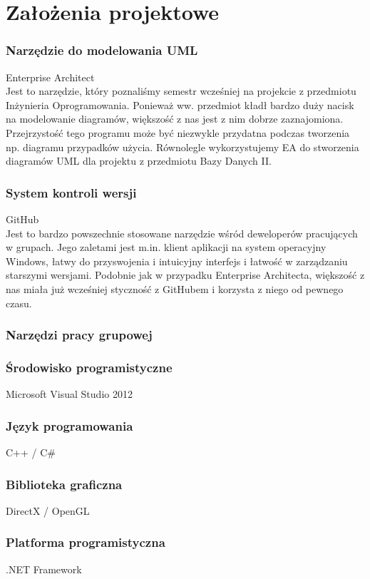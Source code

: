\documentclass[a4paper,twoside]{article}
\begin{document}



\newpage

\part{\huge \textbf{Założenia projektowe}}

\section{Narzędzie do modelowania UML}

{\Large Enterprise Architect} \\
Jest to narzędzie, który poznaliśmy semestr wcześniej na projekcie z przedmiotu Inżynieria Oprogramowania. Ponieważ ww. przedmiot kładł bardzo duży nacisk na modelowanie diagramów, większość z nas jest z nim dobrze zaznajomiona. Przejrzystość tego programu może być niezwykle przydatna podczas tworzenia np. diagramu przypadków użycia. Równolegle wykorzystujemy EA do stworzenia diagramów UML dla projektu z przedmiotu Bazy Danych II.

\section{System kontroli wersji}

{\Large GitHub} \\
Jest to bardzo powszechnie stosowane narzędzie wśród deweloperów pracujących w grupach. Jego zaletami jest m.in. klient aplikacji na system operacyjny Windows, łatwy do przyswojenia i intuicyjny interfejs i łatwość w zarządzaniu starszymi wersjami. Podobnie jak w przypadku Enterprise Architecta, większość z nas miała już wcześniej styczność z GitHubem i korzysta z niego od pewnego czasu.

\section{Narzędzi pracy grupowej}
\section{Środowisko programistyczne}
{\Large Microsoft Visual Studio 2012}
\section{Język programowania}
{\Large C++ / C\#}
\section{Biblioteka graficzna}
{\Large DirectX / OpenGL}
\section{Platforma programistyczna}
{\Large .NET Framework}
\end{document}
